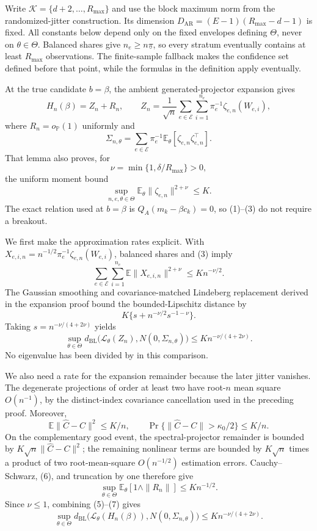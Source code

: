 Write \(\mathcal K=\{d+2,\ldots,R_{\max}\}\) and use the block maximum norm from the randomized-jitter construction.  Its dimension \(D_{\mathrm{AR}}=(E-1)(R_{\max}-d-1)\) is fixed.  All constants below depend only on the fixed envelopes defining \(\Theta\), never on \(\theta\in\Theta\).  Balanced shares give \(n_e\geq n\underline\pi\), so every stratum eventually contains at least \(R_{\max}\) observations.  The finite-sample fallback makes the confidence set defined before that point, while the formulas in the definition apply eventually.

At the true candidate \(b=\beta\), the ambient generated-projector expansion gives
\[
 H_n(\beta)=Z_n+R_n,
 \qquad
 Z_n=\frac1{\sqrt n}\sum_{e\in\mathcal E}\sum_{i=1}^{n_e}
 \pi_e^{-1}\zeta_{e,n}(W_{e,i}), \tag{1}
\]
where \(R_n=o_{\mathbb P}(1)\) uniformly and
\[
 \Sigma_{n,\theta}=\sum_{e\in\mathcal E}\pi_e^{-1}
 \mathbb E_\theta[\zeta_{e,n}\zeta_{e,n}^\top]. \tag{2}
\]
That lemma also proves, for
\[
 \nu=\min\{1,\delta/R_{\max}\}>0,
\]
the uniform moment bound
\[
 \sup_{n,e,\theta\in\Theta}
 \mathbb E_\theta\|\zeta_{e,n}\|^{2+\nu}\leq K. \tag{3}
\]
The exact relation used at \(b=\beta\) is
\(Q_A(m_k-\beta c_k)=0\), so (1)--(3) do not require a breakout.

We first make the approximation rates explicit.  With
\(X_{e,i,n}=n^{-1/2}\pi_e^{-1}\zeta_{e,n}(W_{e,i})\), balanced shares and (3) imply
\[
 \sum_{e\in\mathcal E}\sum_{i=1}^{n_e}
 \mathbb E\|X_{e,i,n}\|^{2+\nu}
 \leq K n^{-\nu/2}. \tag{4}
\]
The Gaussian smoothing and covariance-matched Lindeberg replacement derived in the expansion proof bound the bounded-Lipschitz distance by
\[
 K\{s+n^{-\nu/2}s^{-1-\nu}\}.
\]
Taking \(s=n^{-\nu/(4+2\nu)}\) yields
\[
 \sup_{\theta\in\Theta}
 d_{\mathrm{BL}}\bigl(\mathcal L_\theta(Z_n),
 N(0,\Sigma_{n,\theta})\bigr)
 \leq K n^{-\nu/(4+2\nu)}. \tag{5}
\]
No eigenvalue has been divided by in this comparison.

We also need a rate for the expansion remainder because the later jitter vanishes.  The degenerate projections of order at least two have root-\(n\) mean square \(O(n^{-1})\), by the distinct-index covariance cancellation used in the preceding proof.  Moreover,
\[
 \mathbb E\|\widehat C-C\|^2\leq K/n,
 \qquad
 \Pr\{\|\widehat C-C\|>\kappa_0/2\}\leq K/n. \tag{6}
\]
On the complementary good event, the spectral-projector remainder is bounded by
\(K\sqrt n\|\widehat C-C\|^2\); the remaining nonlinear terms are bounded by \(K\sqrt n\) times a product of two root-mean-square \(O(n^{-1/2})\) estimation errors.  Cauchy--Schwarz, (6), and truncation by one therefore give
\[
 \sup_{\theta\in\Theta}
 \mathbb E_\theta[1\wedge\|R_n\|]
 \leq K n^{-1/2}. \tag{7}
\]
Since \(\nu\leq1\), combining (5)--(7) gives
\[
 \sup_{\theta\in\Theta}
 d_{\mathrm{BL}}\bigl(\mathcal L_\theta(H_n(\beta)),
 N(0,\Sigma_{n,\theta})\bigr)
 \leq K n^{-\nu/(4+2\nu)}. \tag{8}
\]

